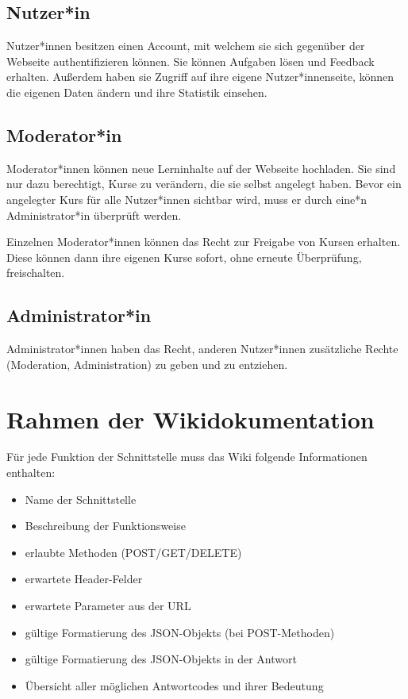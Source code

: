 \documentclass[accentcolor=tud0b,12pt,paper=a4]{tudreport}
\begin{document}
\subsection{Nutzer*in}
Nutzer*innen besitzen einen Account, mit welchem sie sich gegenüber der Webseite authentifizieren können. Sie können Aufgaben lösen und Feedback erhalten. Außerdem haben sie Zugriff auf ihre eigene Nutzer*innenseite, können die eigenen Daten ändern und ihre Statistik einsehen.

\subsection{Moderator*in}
Moderator*innen können neue Lerninhalte auf der Webseite hochladen. Sie sind nur dazu berechtigt, Kurse zu verändern, die sie selbst angelegt haben. Bevor ein angelegter Kurs für alle Nutzer*innen sichtbar wird, muss er durch eine*n Administrator*in überprüft werden.

Einzelnen Moderator*innen können das Recht zur Freigabe von Kursen erhalten. Diese können dann ihre eigenen Kurse sofort, ohne erneute Überprüfung, freischalten.

\subsection{Administrator*in}
Administrator*innen haben das Recht, anderen Nutzer*innen zusätzliche Rechte (Moderation, Administration) zu geben und zu entziehen.

\section{Rahmen der Wikidokumentation}
Für jede Funktion der Schnittstelle muss das Wiki folgende Informationen enthalten:
\begin{multicols}{2}
\begin{itemize}
	\item Name der Schnittstelle
	\item Beschreibung der Funktionsweise
	\item erlaubte Methoden (POST/GET/DELETE)
	\item erwartete Header-Felder
	\item erwartete Parameter aus der URL
	\item gültige Formatierung des JSON-Objekts (bei POST-Methoden)
	\item gültige Formatierung des JSON-Objekts in der Antwort
	\item Übersicht aller möglichen Antwortcodes und ihrer Bedeutung
\end{itemize}
\end{multicols}
\end{document}
